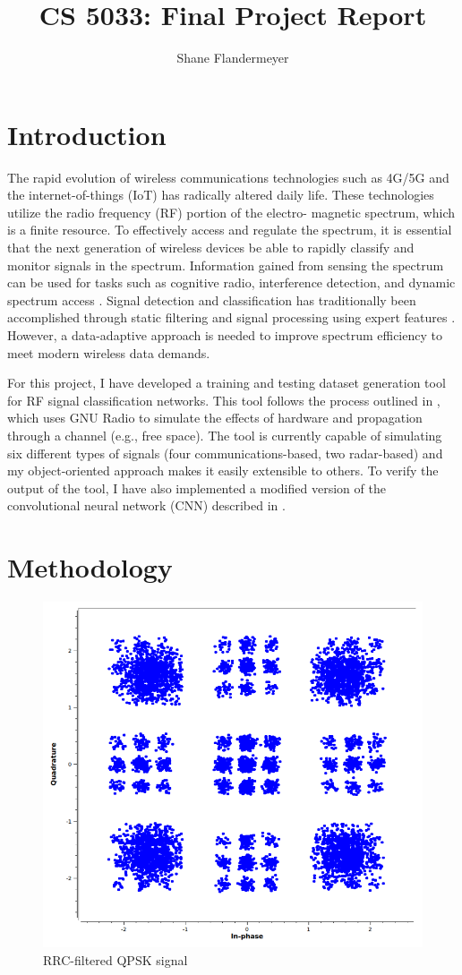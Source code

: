 \documentclass{article}
\title{CS 5033: Final Project Report}
\author{Shane Flandermeyer}
\date{}
\begin{document}
\maketitle

\section{Introduction}

The rapid evolution of wireless communications technologies such as 4G/5G and the internet-of-things (IoT)
has radically altered daily life. These technologies utilize the radio frequency (RF) portion of the electro-
magnetic spectrum, which is a finite resource. To effectively access and regulate the spectrum, it is essential
that the next generation of wireless devices be able to rapidly classify and monitor signals in the spectrum.
Information gained from sensing the spectrum can be used for tasks such as cognitive radio, interference
detection, and dynamic spectrum access \cite{Kulin2018}. Signal
detection and classification has traditionally been accomplished through static filtering and
signal processing using expert features \cite{Ariananda2009}. However, a
data-adaptive approach is needed to improve spectrum efficiency to meet modern
wireless data demands.

For this project, I have developed a training and testing dataset generation
tool for RF signal classification networks. This tool follows the process outlined
in \cite{OShea2016}, which uses GNU Radio to simulate the effects of hardware
and propagation through a channel (e.g., free space). The tool is currently
capable of simulating six different types of signals (four
communications-based, two radar-based) and my object-oriented approach makes it
easily extensible to others. To verify the output of the tool, I have also
implemented a modified version of the convolutional neural network (CNN)
described in \cite{OShea2016a}.


\section{Methodology}


\begin{figure}[H]
    \centering
    \includegraphics[width=0.45\linewidth]{qpsk.png}
    \caption{RRC-filtered QPSK signal}
    \label{fig:qpsk}
\end{figure}
\end{document}

